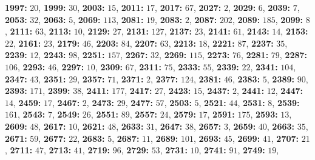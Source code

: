 \textsf{\bfseries 1997:} $20$, \textsf{\bfseries 1999:} $30$, \textsf{\bfseries 2003:} $15$, \textsf{\bfseries 2011:} $17$, \textsf{\bfseries 2017:} $67$, \textsf{\bfseries 2027:} $2$, \textsf{\bfseries 2029:} $6$, \textsf{\bfseries 2039:} $7$, \textsf{\bfseries 2053:} $32$, \textsf{\bfseries 2063:} $5$, \textsf{\bfseries 2069:} $113$, \textsf{\bfseries 2081:} $19$, \textsf{\bfseries 2083:} $2$, \textsf{\bfseries 2087:} $202$, \textsf{\bfseries 2089:} $185$, \textsf{\bfseries 2099:} $8$, \textsf{\bfseries 2111:} $63$, \textsf{\bfseries 2113:} $10$, \textsf{\bfseries 2129:} $27$, \textsf{\bfseries 2131:} $127$, \textsf{\bfseries 2137:} $23$, \textsf{\bfseries 2141:} $61$, \textsf{\bfseries 2143:} $14$, \textsf{\bfseries 2153:} $22$, \textsf{\bfseries 2161:} $23$, \textsf{\bfseries 2179:} $46$, \textsf{\bfseries 2203:} $84$, \textsf{\bfseries 2207:} $63$, \textsf{\bfseries 2213:} $18$, \textsf{\bfseries 2221:} $87$, \textsf{\bfseries 2237:} $35$, \textsf{\bfseries 2239:} $12$, \textsf{\bfseries 2243:} $98$, \textsf{\bfseries 2251:} $157$, \textsf{\bfseries 2267:} $32$, \textsf{\bfseries 2269:} $115$, \textsf{\bfseries 2273:} $76$, \textsf{\bfseries 2281:} $79$, \textsf{\bfseries 2287:} $106$, \textsf{\bfseries 2293:} $46$, \textsf{\bfseries 2297:} $10$, \textsf{\bfseries 2309:} $67$, \textsf{\bfseries 2311:} $75$, \textsf{\bfseries 2333:} $55$, \textsf{\bfseries 2339:} $22$, \textsf{\bfseries 2341:} $104$, \textsf{\bfseries 2347:} $43$, \textsf{\bfseries 2351:} $29$, \textsf{\bfseries 2357:} $71$, \textsf{\bfseries 2371:} $2$, \textsf{\bfseries 2377:} $124$, \textsf{\bfseries 2381:} $46$, \textsf{\bfseries 2383:} $5$, \textsf{\bfseries 2389:} $90$, \textsf{\bfseries 2393:} $171$, \textsf{\bfseries 2399:} $38$, \textsf{\bfseries 2411:} $177$, \textsf{\bfseries 2417:} $27$, \textsf{\bfseries 2423:} $15$, \textsf{\bfseries 2437:} $2$, \textsf{\bfseries 2441:} $12$, \textsf{\bfseries 2447:} $14$, \textsf{\bfseries 2459:} $17$, \textsf{\bfseries 2467:} $2$, \textsf{\bfseries 2473:} $29$, \textsf{\bfseries 2477:} $57$, \textsf{\bfseries 2503:} $5$, \textsf{\bfseries 2521:} $44$, \textsf{\bfseries 2531:} $8$, \textsf{\bfseries 2539:} $161$, \textsf{\bfseries 2543:} $7$, \textsf{\bfseries 2549:} $26$, \textsf{\bfseries 2551:} $89$, \textsf{\bfseries 2557:} $24$, \textsf{\bfseries 2579:} $17$, \textsf{\bfseries 2591:} $175$, \textsf{\bfseries 2593:} $13$, \textsf{\bfseries 2609:} $48$, \textsf{\bfseries 2617:} $10$, \textsf{\bfseries 2621:} $48$, \textsf{\bfseries 2633:} $31$, \textsf{\bfseries 2647:} $38$, \textsf{\bfseries 2657:} $3$, \textsf{\bfseries 2659:} $40$, \textsf{\bfseries 2663:} $35$, \textsf{\bfseries 2671:} $59$, \textsf{\bfseries 2677:} $22$, \textsf{\bfseries 2683:} $5$, \textsf{\bfseries 2687:} $11$, \textsf{\bfseries 2689:} $101$, \textsf{\bfseries 2693:} $45$, \textsf{\bfseries 2699:} $41$, \textsf{\bfseries 2707:} $21$, \textsf{\bfseries 2711:} $47$, \textsf{\bfseries 2713:} $41$, \textsf{\bfseries 2719:} $96$, \textsf{\bfseries 2729:} $53$, \textsf{\bfseries 2731:} $10$, \textsf{\bfseries 2741:} $91$, \textsf{\bfseries 2749:} $19$, 
